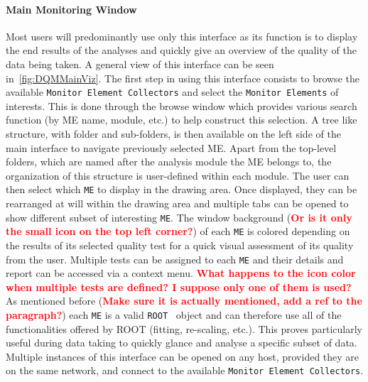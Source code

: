 \documentclass{webofc}
\begin{document}
\paragraph{Main Monitoring Window}\label{par:MainGUI}

Most users will predominantly use only this interface as its function is to display the end results of the analyses and quickly give an overview of the quality of the data being taken.
A general view of this interface can be seen in~\autoref{fig:DQMMainViz}.
The first step in using this interface consists to browse the available \texttt{Monitor Element Collectors} and select the \texttt{Monitor Elements} of interests.
This is done through the browse window which provides various search function (by ME name, module, etc.) to help construct this selection.
A tree like structure, with folder and sub-folders, is then available on the left side of the main interface to navigate previously selected ME.
Apart from the top-level folders, which are named after the analysis module the ME belongs to, the organization of this structure is user-defined within each module. 
The user can then select which \texttt{ME} to display in the drawing area. Once displayed, they can be rearranged at will within the drawing area and multiple tabs can be opened to show different subset of interesting \texttt{ME}. 
The window background (\textcolor{red}{\textbf{Or is it only the small icon on the top left corner?}}) of each \texttt{ME} is colored depending on the results of its selected quality test for a quick visual assessment of its quality from the user.
Multiple tests can be assigned to each \texttt{ME} and their details and report can be accessed via a context menu. \textcolor{red}{\textbf{What happens to the icon color when multiple tests are defined? I suppose only one of them is used?}}
As mentioned before (\textcolor{red}{\textbf{Make sure it is actually mentioned, add a ref to the paragraph?}}) each \texttt{ME} is a valid \texttt{ROOT}~\cite{ROOT} object and can therefore use all of the functionalities offered by ROOT (fitting, re-scaling, etc.).
This proves particularly useful during data taking to quickly glance and analyse a specific subset of data. 
Multiple instances of this interface can be opened on any host, provided they are on the same network, and connect to the available \texttt{Monitor Element Collectors}. 
\end{document}
